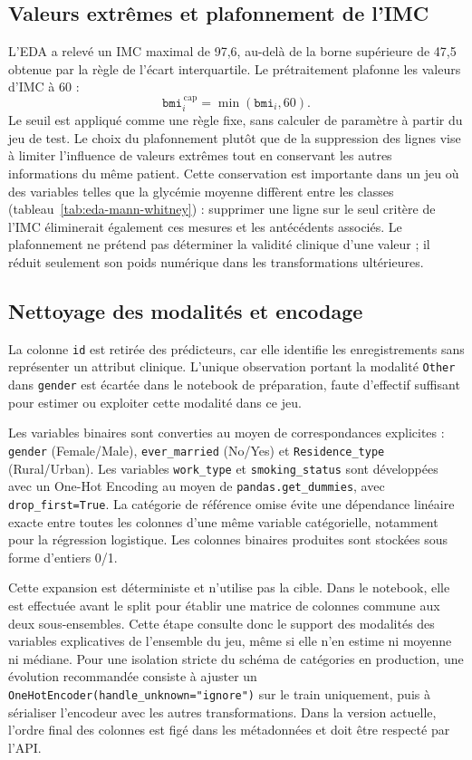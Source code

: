 \subsection{Valeurs extrêmes et plafonnement de l'IMC}
L'EDA a relevé un IMC maximal de 97,6, au-delà de la borne supérieure de 47,5 obtenue par la règle de l'écart interquartile. Le prétraitement plafonne les valeurs d'IMC à 60 :
\[
\texttt{bmi}_{i}^{\,\mathrm{cap}} = \min(\texttt{bmi}_{i}, 60).
\]
Le seuil est appliqué comme une règle fixe, sans calculer de paramètre à partir du jeu de test. Le choix du plafonnement plutôt que de la suppression des lignes vise à limiter l'influence de valeurs extrêmes tout en conservant les autres informations du même patient. Cette conservation est importante dans un jeu où des variables telles que la glycémie moyenne diffèrent entre les classes (tableau~\ref{tab:eda-mann-whitney}) : supprimer une ligne sur le seul critère de l'IMC éliminerait également ces mesures et les antécédents associés. Le plafonnement ne prétend pas déterminer la validité clinique d'une valeur ; il réduit seulement son poids numérique dans les transformations ultérieures.

\subsection{Nettoyage des modalités et encodage}
La colonne \texttt{id} est retirée des prédicteurs, car elle identifie les enregistrements sans représenter un attribut clinique. L'unique observation portant la modalité \texttt{Other} dans \texttt{gender} est écartée dans le notebook de préparation, faute d'effectif suffisant pour estimer ou exploiter cette modalité dans ce jeu.

Les variables binaires sont converties au moyen de correspondances explicites : \texttt{gender} (Female/Male), \texttt{ever\_married} (No/Yes) et \texttt{Residence\_type} (Rural/Urban). Les variables \texttt{work\_type} et \texttt{smoking\_status} sont développées avec un One-Hot Encoding au moyen de \texttt{pandas.get\_dummies}, avec \texttt{drop\_first=True}. La catégorie de référence omise évite une dépendance linéaire exacte entre toutes les colonnes d'une même variable catégorielle, notamment pour la régression logistique. Les colonnes binaires produites sont stockées sous forme d'entiers 0/1.

Cette expansion est déterministe et n'utilise pas la cible. Dans le notebook, elle est effectuée avant le split pour établir une matrice de colonnes commune aux deux sous-ensembles. Cette étape consulte donc le support des modalités des variables explicatives de l'ensemble du jeu, même si elle n'en estime ni moyenne ni médiane. Pour une isolation stricte du schéma de catégories en production, une évolution recommandée consiste à ajuster un \texttt{OneHotEncoder(handle\_unknown="ignore")} sur le train uniquement, puis à sérialiser l'encodeur avec les autres transformations. Dans la version actuelle, l'ordre final des colonnes est figé dans les métadonnées et doit être respecté par l'API.

